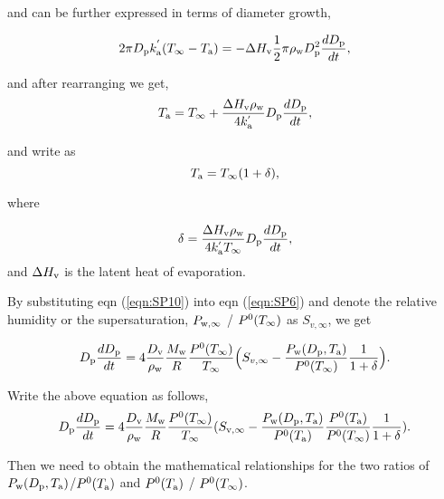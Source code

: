 \documentclass[12pt]{article}
\begin{document}
and can be further expressed in terms of diameter growth, 

\begin{equation}\label{eqn:SP8}
2 \pi D_{\rm p} k^{'}_{\rm a} (T_{\infty}-T_{\rm a})= -\Delta H_{\rm v} \frac{1}{2} \pi \rho_{\rm w} D_{\rm p}^{2} \frac{dD_{\rm p}}{dt},
\end{equation}

and after rearranging we get, 
\begin{equation}\label{eqn:SP9}
T_{\rm a}= T_{\infty} + \frac{\Delta H_{\rm v}  \rho_{\rm w}}{4 k^{'}_{\rm a}} D_{\rm p} \frac{dD_{\rm p}}{dt},
\end{equation}

and write as 
\begin{equation}\label{eqn:SP10}
T_{\rm a}=T_{\infty}(1+\delta),
\end{equation}

where 

\begin{equation}\label{eqn:SP11}
\delta= \frac{\Delta H_{\rm v}  \rho_{\rm w}}{4 k^{'}_{\rm a}T_{\infty}} D_{\rm p} \frac{dD_{\rm p}}{dt}, 
\end{equation}
and $\Delta H_{\rm v}$ is the latent heat of evaporation.


By substituting eqn (\ref{eqn:SP10}) into eqn (\ref{eqn:SP6}) and denote the relative humidity or the supersaturation, $P_{\rm w, \infty}$ / $P^{\rm 0}(T_{\infty})$ as $S_{v, \infty}$, we get 

\begin{equation}\label{eqn:SP12}
D_{\rm p}\frac{dD_{\rm p}}{dt}=4 \frac{D_{\rm v}} {\rho_{\rm w}} \frac{M_{\rm w}}{R} \frac{P^{\rm 0}(T_{\infty})} {T_{\infty}} \Big(S_{v, \infty} - \frac{P_{\rm w}(D_{\rm p}, T_{\rm a})}{P^{\rm 0}(T_{\infty})} \frac{1}{1+\delta}\Big).
\end{equation}


Write the above equation as follows,
\begin{equation}\label{eqn:SP13}
D_{\rm p}\frac{dD_{\rm p}}{dt}=4 \frac{D_{\rm v}} {\rho_{\rm w}} \frac{M_{\rm w}}{R} \frac{P^{\rm 0}(T_{\infty})} {T_{\infty}} (S_{\rm v, \infty} - \frac{P_{\rm w}(D_{\rm p}, T_{\rm a})}{P^{\rm 0}(T_{\rm a})} \frac{P^{\rm 0}(T_{\rm a})}{P^{\rm 0}(T_{\infty})}\frac{1}{1+\delta}).
\end{equation}


Then we need to obtain the mathematical relationships for the two ratios of $P_{\rm w}(D_{\rm p}, T_{\rm a})$/$P^{\rm 0}(T_{\rm a})$ and $P^{\rm 0}(T_{\rm a})$ / $P^{\rm 0}(T_{\infty})$. 
\end{document}
